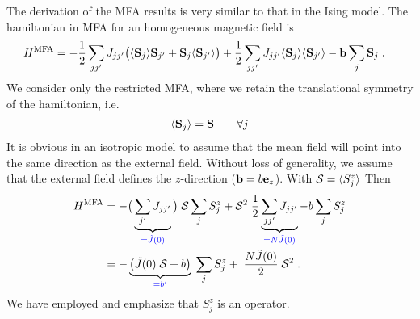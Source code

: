The derivation of the MFA results is very similar to that in the Ising model.
The  hamiltonian in MFA for an homogeneous magnetic field is
%
\begin{align}\label{eq:}
H^\text{MFA} &= -\frac{1}{2}\sum_{jj'} J_{jj'} \big(\langle \mathbf S_{j} \rangle\mathbf S_{j'} +
 \mathbf S_{j}  \langle \mathbf S_{j'} \rangle \big)+ \frac{1}{2}\sum_{jj'} J_{jj'} \langle \mathbf S_{j} \rangle\langle \mathbf S_{j'} \rangle - \mathbf b \sum_{j} \mathbf S_{j}\;.
\end{align}
%
We consider only the restricted MFA, where we retain the  translational symmetry of the 
hamiltonian, i.e.
%
\begin{align*}
\langle \mathbf S_{j} \rangle =\mathbf S \qquad \forall j
\end{align*}
%
It is obvious in an isotropic model to assume that the mean field will point into the same 
direction as the external field. Without loss of generality, 
we assume that the external field defines the $z$-direction ($\mathbf b = b\mathbf e_{z}$). With ${\cal S} = \langle S^{z}_{j} \rangle$
Then
\begin{align*}
H^\text{MFA} &= -  \big(\underbrace{
\sum_{j'} J_{jj'}
}_{\color{blue} =  \tilde J(0)} \big)\;{\cal S}\sum_{j} S^{z}_{j} + {\cal S}^{2} \;\frac{1}{2}\underbrace{
\sum_{jj'} J_{jj'} 
}_{\color{blue} = N \tilde J(0)} -  b \sum_{j} S^{z}_{j}\\
&= - \underbrace{
\big( \tilde J(0) \;{\cal S} + b\big)
}_{\color{blue} = b'}\;\sum_{j}  S_{j}^{z} + 
\;\frac{N \tilde J(0)}{2} \;{\cal S}^{2} \;.
\end{align*}
We have employed   and emphasize that
 $S^{z}_{j}$ is an operator.
 
